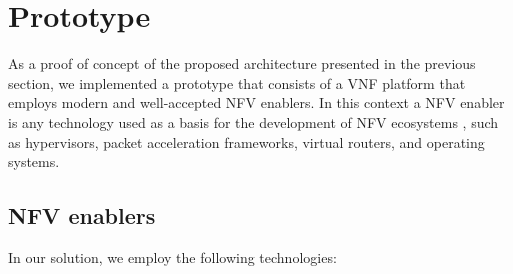 \section{Prototype}\label{PROTO}





As a proof of concept of the proposed architecture presented in the previous section, we implemented a prototype that consists of a VNF platform that employs modern and well-accepted NFV enablers. In this context a NFV enabler is any technology used as a basis for the development of NFV ecosystems \cite{ETSI-2012}, such as hypervisors, packet acceleration frameworks, virtual routers, and operating systems.

\subsection{NFV enablers}

In our solution, we employ the following technologies:

